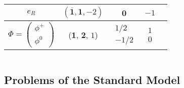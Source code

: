 \documentclass[hyperref={bookmarks=false},aspectratio=169]{beamer}
\begin{document}
\begin{frame}
\begin{columns}
\begin{table}[]
{\begin{tabular}{c|c|c|c|c}
				$e_R $ & $(\overline{\textbf{1}}, \textbf{1}, -2)$ & 0 & $-1$ \\ \hline
				
			    	
				$\Phi=\begin{pmatrix} 
				\phi^+  \\
				\phi^{0}
				\end{pmatrix}$ & (\textbf{1}, \textbf{2}, $1$) &  $\begin{matrix} 
				1/2  \\
				-1/2 
				\end{matrix}$ & $\begin{matrix} 
				1  \\
				0 
				\end{matrix}$      \\ 
				
				
		\end{tabular}}
	\end{table}
	
\end{columns}

\end{frame}


\subsection{Problems of the Standard Model}

\end{document}
